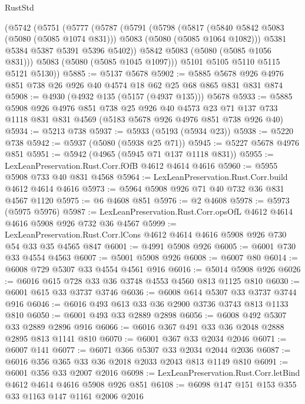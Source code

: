 \begin{lexlean}{RustStd}
\begin{coremodule}
    (@5742
      (@5751
        (@5777
          (@5787
            (@5791
              (@5798
                (@5817
                  (@5840 @5842 @5083 (@5080 (@5085 @1074 @831)))
                  @5083
                  (@5080 (@5085 @1064 @1082)))
                @5381
                @5384
                @5387
                @5391
                @5396
                @5402))
            @5842
            @5083
            (@5080 (@5085 @1056 @831)))
          @5083
          (@5080 (@5085 @1045 @1097)))
        @5101
        @5105
        @5110
        @5115
        @5121
        @5130))
@5885 := @5137 @5678
@5902 := @5885 @5678 @926 @4976 @851 @738 @26 @926 @40 @4574 @18 @62 @25 @68 @865 @831 @831 @874
@5908 := @4930 (@4932 @135 (@5157 (@4937 @135))) @5678
@5933 := @5885
    @5908
    @926
    @4976
    @851
    @738
    @25
    @926
    @40
    @4573
    @23
    @71
    @137
    @733
    @1118
    @831
    @831
    @4569
    (@5183 @5678 @926 @4976 @851 @738 @926 @40)
@5934 := @5213 @738
@5937 := @5933 (@5193 (@5934 @23))
@5938 := @5220 @738
@5942 := @5937 (@5080 (@5938 @25 @71))
@5945 := @5227 @5678 @4976 @851
@5951 := @5942 (@4965 (@5945 @71 @137 @1118 @831))
@5955 := LexLeanPreservation.Rust.Corr.fOfB @4612 @4614 @4616
@5960 := @5955 @5908 @733 @40 @831 @4568
@5964 := LexLeanPreservation.Rust.Corr.build @4612 @4614 @4616
@5973 := @5964 @5908 @926 @71 @40 @732 @36 @831 @4567 @1120
@5975 := @6 @4608 @851
@5976 := @2 @4608
@5978 := @5973 (@5975 @5976)
@5987 := LexLeanPreservation.Rust.Corr.opsOfL @4612 @4614 @4616 @5908 @926 @732 @36 @4567
@5999 := LexLeanPreservation.Rust.Corr.lCons
    @4612
    @4614
    @4616
    @5908
    @926
    @730
    @54
    @33
    @35
    @4565
    @847
@6001 := @4991 @5908 @926
@6005 := @6001 @730 @33 @4554 @4563
@6007 := @5001 @5908 @926
@6008 := @6007 @80
@6014 := @6008 @729 @5307 @33 @4554 @4561 @916
@6016 := @5014 @5908 @926
@6026 := @6016 @615 @728 @33 @36 @3748 @4553 @4560 @813 @1125 @810
@6030 := @6001 @615 @33 @3737 @3746
@6036 := @6008 @614 @5307 @33 @3737 @3744 @916
@6046 := @6016 @493 @613 @33 @36 @2900 @3736 @3743 @813 @1133 @810
@6050 := @6001 @493 @33 @2889 @2898
@6056 := @6008 @492 @5307 @33 @2889 @2896 @916
@6066 := @6016 @367 @491 @33 @36 @2048 @2888 @2895 @813 @1141 @810
@6070 := @6001 @367 @33 @2034 @2046
@6071 := @6007 @141
@6077 := @6071 @366 @5307 @33 @2034 @2044 @2036
@6087 := @6016 @356 @365 @33 @36 @2018 @2033 @2043 @813 @1149 @810
@6091 := @6001 @356 @33 @2007 @2016
@6098 := LexLeanPreservation.Rust.Corr.letBind @4612 @4614 @4616 @5908 @926 @851
@6108 := @6098 @147 @151 @153 @355 @33 @1163 @147 @1161 @2006 @2016

\end{coremodule}
\end{lexlean}
